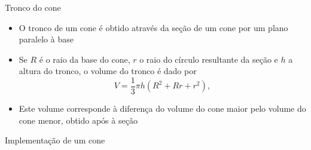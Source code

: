 \begin{frame}[fragile]{Tronco do cone}

    \begin{itemize}
        \item O tronco de um cone é obtido através da seção de um cone por um plano paralelo à base

        \item Se $R$ é o raio da base do cone, $r$ o raio do círculo resultante da seção e $h$ a 
            altura do tronco, o volume do tronco é dado por
        \[
            V = \frac{1}{3}\pi h(R^2 + Rr + r^2),
        \]

        \item Este volume corresponde à diferença do volume do cone maior pelo volume do cone menor,
            obtido após à seção

    \end{itemize}

    \begin{figure}
        \centering
    \end{figure}

\end{frame}

\begin{frame}[fragile]{Implementação de um cone}
\end{frame}
